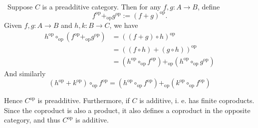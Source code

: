 
\def\op{\text{op}}


\mmaketitle

\begin{exercise}[1]\ 

\end{exercise}


\begin{exercise}[2]\ 
Suppose $C$ is a preadditive category. Then 
for any $f,g : A \to B$, define
\[ f^\op +_\op g^\op := (f + g)^\op. \]
Given $f,g : A \to B$ and $h,k : B \to C$, we have
\begin{align*}
h^\op \circ_\op (f^\op +_\op g^\op)  
&= ((f+g)\circ h)^\op \\
&= ((f\circ h) + (g\circ h))^\op \\
&= (h^\op \circ_\op f^\op) +_\op (h^\op \circ_\op g^\op)
\end{align*}
And similarly 
\[ (h^\op + k^\op) \circ_\op f^\op = (h^\op \circ_\op f^\op) +_\op (k^\op \circ_\op
f^\op) \]

Hence $C^\op$ is preadditive. 
Furthermore, if $C$ is additive, i. e. has finite coproducts. 
Since the coproduct is also a product, it also defines a coproduct in the
opposite category, and thus $C^\op$ is additive.
\end{exercise}


